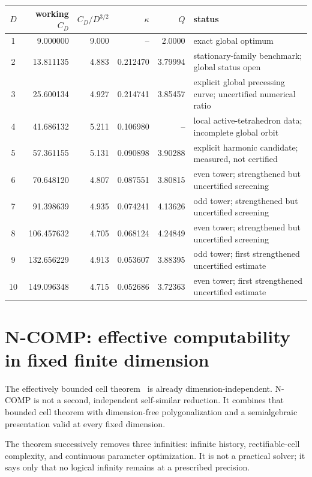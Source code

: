 \documentclass[10pt,a4paper]{article}
\theoremstyle{plain}
\theoremstyle{definition}
\theoremstyle{remark}
\begin{document}
\begin{center}
\scriptsize
\begin{tabularx}{\linewidth}{@{}c r r r r X@{}}
\toprule
$D$ & working $C_D$ & $C_D/D^{3/2}$ & $\kappa$ & $Q$ & status\\
\midrule
1 & 9.000000 & 9.000 & -- & 2.0000 & exact global optimum\\
2 & 13.811135 & 4.883 & 0.212470 & 3.79994 & stationary-family benchmark; global status open\\
3 & 25.600134 & 4.927 & 0.214741 & 3.85457 & explicit global precessing curve; uncertified numerical ratio\\
4 & 41.686132 & 5.211 & 0.106980 & -- & local active-tetrahedron data; incomplete global orbit\\
5 & 57.361155 & 5.131 & 0.090898 & 3.90288 & explicit harmonic candidate; measured, not certified\\
6 & 70.648120 & 4.807 & 0.087551 & 3.80815 & even tower; strengthened but uncertified screening\\
7 & 91.398639 & 4.935 & 0.074241 & 4.13626 & odd tower; strengthened but uncertified screening\\
8 & 106.457632 & 4.705 & 0.068124 & 4.24849 & even tower; strengthened but uncertified screening\\
9 & 132.656229 & 4.913 & 0.053607 & 3.88395 & odd tower; first strengthened uncertified estimate\\
10 & 149.096348 & 4.715 & 0.052686 & 3.72363 & even tower; first strengthened uncertified estimate\\
\bottomrule
\end{tabularx}
\end{center}

\section{N-COMP: effective computability in fixed finite dimension}

The effectively bounded cell theorem~\cite[Theorem~5.1]{koch-cell} is already dimension-independent. N-COMP is not a second, independent self-similar reduction. It combines that bounded cell theorem with dimension-free polygonalization and a semialgebraic presentation valid at every fixed dimension.

The theorem successively removes three infinities: infinite history, rectifiable-cell complexity, and continuous parameter optimization. It is not a practical solver; it says only that no logical infinity remains at a prescribed precision.
\end{document}
